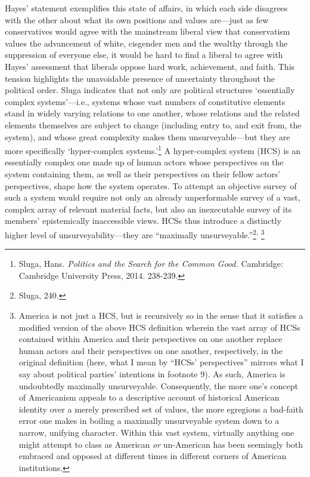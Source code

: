 Hayes' statement exemplifies this state of affairs, in which each side
disagrees with the other about what its own positions and values
are---just as few conservatives would agree with the mainstream liberal
view that conservatism values the advancement of white, cisgender men
and the wealthy through the suppression of everyone else, it would be
hard to find a liberal to agree with Hayes' assessment that liberals
oppose hard work, achievement, and faith. This tension highlights the
unavoidable presence of uncertainty throughout the political order.
Sluga indicates that not only are political structures `essentially
complex systems'---i.e., systems whose vast numbers of constitutive
elements stand in widely varying relations to one another, whose
relations and the related elements themselves are subject to change
(including entry to, and exit from, the system), and whose great
complexity makes them unsurveyable---but they are more specifically
`hyper-complex systems.'\footnote{Sluga, Hans. \emph{Politics and the
  Search for the Common Good.} Cambridge: Cambridge University Press,
  2014. 238-239.} A hyper-complex system (HCS) is an essentially complex
one made up of human actors whose perspectives on the system containing
them, as well as their perspectives on their fellow actors'
perspectives, shape how the system operates. To attempt an objective
survey of such a system would require not only an already unperformable
survey of a vast, complex array of relevant material facts, but also an
inexecutable survey of its members' epistemically inaccessible views.
HCSs thus introduce a distinctly higher level of unsurveyability---they
are ``maximally unsurveyable.''\footnote{Sluga, 240.}\textsuperscript{,}
\footnote{America is not just a HCS, but is recursively so in the sense
  that it satisfies a modified version of the above HCS definition
  wherein the vast array of HCSs contained within America and their
  perspectives on one another replace human actors and their
  perspectives on one another, respectively, in the original definition
  (here, what I mean by ``HCSs' perspectives'' mirrors what I say about
  political parties' intentions in footnote 9). As such, America is
  undoubtedly maximally unsurveyable. Consequently, the more one's
  concept of Americanism appeals to a descriptive account of historical
  American identity over a merely prescribed set of values, the more
  egregious a bad-faith error one makes in boiling a maximally
  unsurveyable system down to a narrow, unifying character. Within this
  vast system, virtually anything one might attempt to class as American
  \emph{or} un-American has been seemingly both embraced and opposed at
  different times in different corners of American institutions.}

